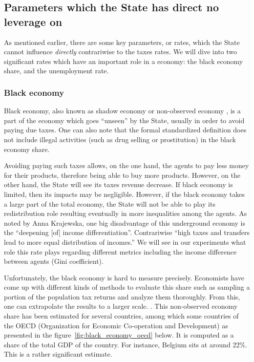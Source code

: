 \subsection{Parameters which the State has direct no leverage on}
    
    As mentioned earlier, there are some key parameters, or rates, which the State cannot influence \emph{directly} contrariwise to the taxes rates. We will dive into two significant rates which have an important role in a economy: the black economy share, and the unemployment rate.

    \subsubsection{Black economy}
    Black economy, also known as shadow economy or non-observed economy \cite{oecdBlack}, is a part of the economy which goes ``unseen'' by the State, usually in order to avoid paying due taxes. One can also note that the formal standardized definition does not include illegal activities (such as drug selling or prostitution) in the black economy share. \cite{pyle1989tax} 
    
    Avoiding paying such taxes allows, on the one hand, the agents to pay less money for their products, therefore being able to buy more products. However, on the other hand, the State will see its taxes revenue decrease. 
    If black economy is limited, then its impacts may be negligible. However, if the black economy takes a large part of the total economy, the State will not be able to play its redistribution role resulting eventually in more inequalities among the agents. As noted by Anna Krajewska, one big disadvantage of this underground economy is the ``deepening [of] income differentiation''. Contrariwise ``high  taxes  and  transfers  lead  to  more  equal  distribution  of incomes.'' \cite{blackEcoImpact} We will see in our experiments what role this rate plays regarding different metrics including the income difference between agents (Gini coefficient).

    Unfortunately, the black economy is hard to measure precisely. Economists have come up with different kinds of methods to evaluate this share such as sampling a portion of the population tax returns and analyze them thoroughly. From this, one can extrapolate the results to a larger scale. \cite{pyle1989tax}. This non-observed economy share has been estimated for several countries, among which some countries of the OECD (Organization for Economic Co-operation and Development) as presented in the figure~\ref{fig:black_economy_oecd} below. It is computed as a share of the total GDP of the country. For instance, Belgium sits at around 22\%. This is a rather significant estimate.
    
